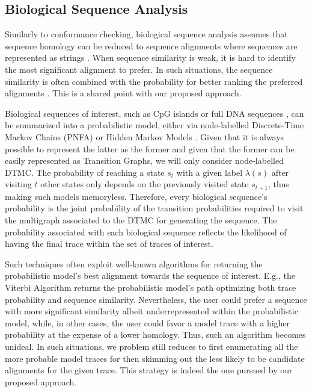 

\subsection{Biological Sequence Analysis}
Similarly to conformance checking, biological sequence analysis assumes that sequence homology can be reduced to sequence alignments where sequences are represented as strings \cite{durbin1998biological}. When sequence similarity is weak, it is hard to identify the most significant alignment to prefer. In such situations, the sequence similarity is often combined with the probability for better ranking the preferred alignments \cite{durbin1998biological}. This is a shared point with our proposed approach. 

Biological sequences of interest, such as CpG islands \cite{kxq005} or full DNA sequences \cite{BISHOP1986159}, can be summarized into a probabilistic model, either via node-labelled Discrete-Time Markov Chains (PNFA) \cite{RyabkoU08} or Hidden Markov Models \cite{Helske2018}. Given that it is always possible to represent the latter as the former \cite{DUPONT20051349} and given that the former can be easily represented as Transition Graphs, we will only consider node-labelled DTMC. The probability of reaching a state $s_t$ with a given label $\lambda(s)$ after visiting $t$ other states only depends on the previously visited state $s_{t+1}$, thus making such models memoryless. Therefore, every biological sequence's probability is the joint probability of the transition probabilities required to visit the multigraph associated to the DTMC for generating the sequence. The probability associated with each biological sequence reflects the likelihood of having the final trace within the set of traces of interest. 

Such techniques often exploit well-known algorithms for returning the probabilistic model's best alignment towards the sequence of interest. E.g., the Viterbi Algorithm \cite{Viterbi67} returns the probabilistic model's path optimizing both trace probability and sequence similarity.  Nevertheless, the user could prefer a sequence with more significant similarity albeit underrepresented within the probabilistic model, while, in other cases, the user could favor a model trace with a higher probability at the expense of a lower homology. Thus, such an algorithm becomes unideal. In such situations, we problem still reduces to first enumerating all the more probable model traces for then skimming out the less likely to be candidate alignments for the given trace. This strategy is indeed the one pursued by our proposed approach. 
